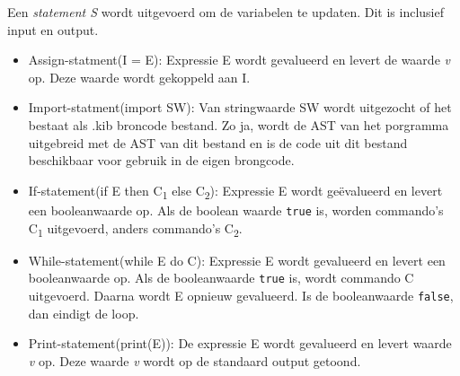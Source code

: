 Een \emph{statement S} wordt uitgevoerd om de variabelen te updaten. Dit is inclusief input en output.
\begin{itemize}
    \item Assign-statment(I = E): Expressie E wordt gevalueerd en levert de waarde \emph{v} op. Deze waarde wordt gekoppeld aan I.
    \item Import-statment(import SW): Van stringwaarde SW wordt uitgezocht of het bestaat als .kib broncode bestand. Zo ja, wordt de AST van het porgramma uitgebreid met de AST van dit bestand en is de code uit dit bestand beschikbaar voor gebruik in de eigen brongcode.
    \item If-statement(if E then C\textsubscript{1} else C\textsubscript{2}): Expressie E wordt ge\"evalueerd en levert een booleanwaarde op. Als de boolean waarde \texttt{true} is, worden commando's C\textsubscript{1} uitgevoerd, anders commando's C\textsubscript{2}. 
    \item While-statement(while E do C): Expressie E wordt gevalueerd en levert een booleanwaarde op. Als de booleanwaarde \texttt{true} is, wordt commando C uitgevoerd. Daarna wordt E opnieuw gevalueerd. Is de booleanwaarde \texttt{false}, dan eindigt de loop.
    \item Print-statement(print(E)): De expressie E wordt gevalueerd en levert waarde \emph{v} op. Deze waarde \emph{v} wordt op de standaard output getoond.
\end{itemize}

